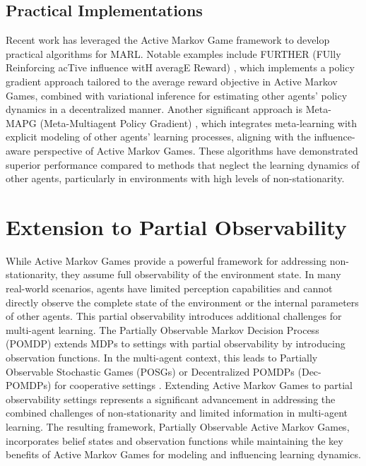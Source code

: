 \subsection{Practical Implementations}

Recent work has leveraged the Active Markov Game framework to develop practical algorithms for MARL. Notable examples include FURTHER (FUlly Reinforcing acTive influence witH averagE Reward) \cite{kim2022influencing}, which implements a policy gradient approach tailored to the average reward objective in Active Markov Games, combined with variational inference for estimating other agents' policy dynamics in a decentralized manner. Another significant approach is Meta-MAPG (Meta-Multiagent Policy Gradient) \cite{kim2021policy}, which integrates meta-learning with explicit modeling of other agents' learning processes, aligning with the influence-aware perspective of Active Markov Games. These algorithms have demonstrated superior performance compared to methods that neglect the learning dynamics of other agents, particularly in environments with high levels of non-stationarity.

\section{Extension to Partial Observability}

While Active Markov Games provide a powerful framework for addressing non-stationarity, they assume full observability of the environment state. In many real-world scenarios, agents have limited perception capabilities and cannot directly observe the complete state of the environment or the internal parameters of other agents. This partial observability introduces additional challenges for multi-agent learning. The Partially Observable Markov Decision Process (POMDP) \cite{kaelbling1998planning} extends MDPs to settings with partial observability by introducing observation functions. In the multi-agent context, this leads to Partially Observable Stochastic Games (POSGs) \cite{hansen2004dynamic} or Decentralized POMDPs (Dec-POMDPs) for cooperative settings \cite{bernstein2002complexity}. Extending Active Markov Games to partial observability settings represents a significant advancement in addressing the combined challenges of non-stationarity and limited information in multi-agent learning. The resulting framework, Partially Observable Active Markov Games, incorporates belief states and observation functions while maintaining the key benefits of Active Markov Games for modeling and influencing learning dynamics.

